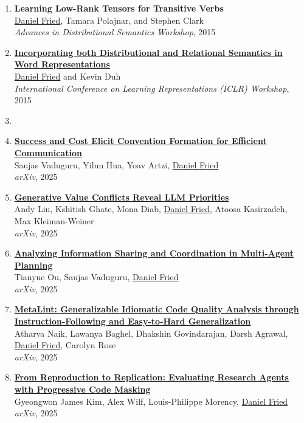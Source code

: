 \begin{enumerate}[leftmargin=-1mm,partopsep=0pt]
\item \textbf{Learning Low-Rank Tensors for Transitive Verbs} \\
  \underline{Daniel Fried}, Tamara Polajnar, and Stephen Clark\\
  \emph{Advances in Distributional Semantics Workshop}, 2015

\item \href{http://arxiv.org/abs/1412.5836}{\textbf{Incorporating both Distributional and Relational Semantics in Word Representations}} \\
  \underline{Daniel Fried} and Kevin Duh\\
  \emph{International Conference on Learning Representations (ICLR) Workshop}, 2015

\item[]

\item \href{https://arxiv.org/abs/2510.24023}{\textbf{Success and Cost Elicit Convention Formation for Efficient Communication}} \\
  Saujas Vaduguru, Yilun Hua, Yoav Artzi, \underline{Daniel Fried}\\
  \emph{arXiv}, 2025

\item \href{https://arxiv.org/abs/2509.25369}{\textbf{Generative Value Conflicts Reveal LLM Priorities}} \\
  Andy Liu, Kshitish Ghate, Mona Diab, \underline{Daniel Fried}, Atoosa Kasirzadeh, Max Kleiman-Weiner\\
  \emph{arXiv}, 2025

\item \href{https://arxiv.org/abs/2508.12981}{\textbf{Analyzing Information Sharing and Coordination in Multi-Agent Planning}} \\
  Tianyue Ou, Saujas Vaduguru, \underline{Daniel Fried}\\
  \emph{arXiv}, 2025

\item \href{https://arxiv.org/abs/2507.11687}{\textbf{MetaLint: Generalizable Idiomatic Code Quality Analysis through Instruction-Following and Easy-to-Hard Generalization}} \\
  Atharva Naik, Lawanya Baghel, Dhakshin Govindarajan, Darsh Agrawal, \underline{Daniel Fried}, Carolyn Rose\\
  \emph{arXiv}, 2025

\item \href{https://arxiv.org/abs/2506.19724}{\textbf{From Reproduction to Replication: Evaluating Research Agents with Progressive Code Masking}} \\
  Gyeongwon James Kim, Alex Wilf, Louis-Philippe Morency, \underline{Daniel Fried}\\
  \emph{arXiv}, 2025


\end{enumerate}
